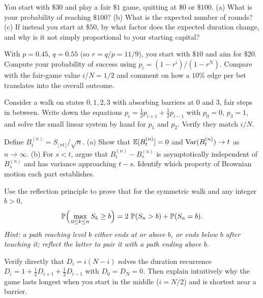 \begin{exercise}
\label{ch26:ex-ruinfair}
You start with $\$30$ and play a fair $\$1$ game, quitting at $\$0$ or
$\$100$. (a) What is your probability of reaching $\$100$? (b) What is the
expected number of rounds? (c) If instead you start at $\$50$, by what factor
does the expected duration change, and why is it not simply proportional to
your starting capital?
\end{exercise}

\begin{exercise}
\label{ch26:ex-ruinbiased}
With $p = 0.45$, $q = 0.55$ (so $r = q/p = 11/9$), you start with $\$10$ and
aim for $\$20$. Compute your probability of success using
$p_i = (1 - r^i)/(1 - r^N)$. Compare with the fair-game value $i/N = 1/2$ and
comment on how a $10\%$ edge per bet translates into the overall outcome.
\end{exercise}

\begin{exercise}
\label{ch26:ex-firststep}
Consider a walk on states $0, 1, 2, 3$ with absorbing barriers at $0$ and $3$,
fair steps in between. Write down the equations $p_i = \tfrac12 p_{i+1} +
\tfrac12 p_{i-1}$ with $p_0 = 0$, $p_3 = 1$, and solve the small linear system
by hand for $p_1$ and $p_2$. Verify they match $i/N$.
\end{exercise}

\begin{exercise}
\label{ch26:ex-scaling}
Define $B_t^{(n)} = S_{\lfloor nt \rfloor}/\sqrt{n}$. (a) Show that
$\E[B_t^{(n)}] = 0$ and $\Var(B_t^{(n)}) \to t$ as $n \to \infty$. (b) For
$s < t$, argue that $B_t^{(n)} - B_s^{(n)}$ is asymptotically independent of
$B_s^{(n)}$ and has variance approaching $t - s$. Identify which property of
Brownian motion each part establishes.
\end{exercise}

\begin{exercise}
\label{ch26:ex-maxproof}
Use the reflection principle to prove that for the symmetric walk and any
integer $b > 0$,
\[
  \P\!\Big(\max_{0 \le k \le n} S_k \ge b\Big)
  = 2\,\P(S_n > b) + \P(S_n = b).
\]
\emph{Hint: a path reaching level $b$ either ends at or above $b$, or ends
below $b$ after touching it; reflect the latter to pair it with a path ending
above $b$.}
\end{exercise}

\begin{exercise}
\label{ch26:ex-durparabola}
Verify directly that $D_i = i(N - i)$ solves the duration recurrence
$D_i = 1 + \tfrac12 D_{i+1} + \tfrac12 D_{i-1}$ with $D_0 = D_N = 0$. Then
explain intuitively why the game lasts longest when you start in the middle
($i = N/2$) and is shortest near a barrier.
\end{exercise}
